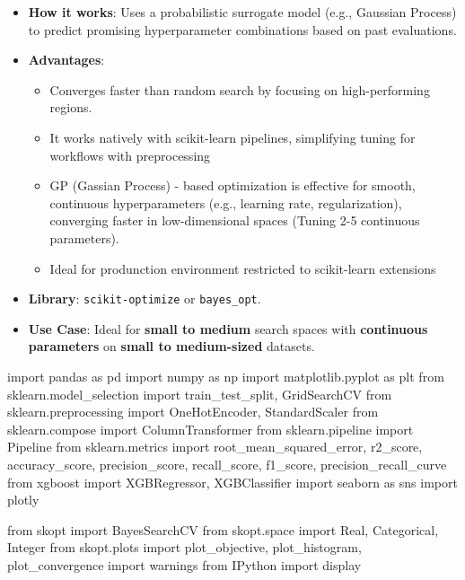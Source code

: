 \documentclass[
  letterpaper,
  DIV=11,
  numbers=noendperiod]{scrreprt}
\newenvironment{Shaded}{\begin{snugshade}}{\end{snugshade}}
\newcommand{\ImportTok}[1]{\textcolor[rgb]{0.00,0.46,0.62}{#1}}
\newcommand{\NormalTok}[1]{\textcolor[rgb]{0.00,0.23,0.31}{#1}}
\providecommand{\tightlist}{%
  \setlength{\itemsep}{0pt}\setlength{\parskip}{0pt}}\usepackage{longtable,booktabs,array}
\begin{document}
\begin{itemize}
\item
  \textbf{How it works}: Uses a probabilistic surrogate model (e.g.,
  Gaussian Process) to predict promising hyperparameter combinations
  based on past evaluations.
\item
  \textbf{Advantages}:

  \begin{itemize}
  \tightlist
  \item
    Converges faster than random search by focusing on high-performing
    regions.
  \item
    It works natively with scikit-learn pipelines, simplifying tuning
    for workflows with preprocessing
  \item
    GP (Gassian Process) - based optimization is effective for smooth,
    continuous hyperparameters (e.g., learning rate, regularization),
    converging faster in low-dimensional spaces (Tuning 2-5 continuous
    parameters).
  \item
    Ideal for produnction environment restricted to scikit-learn
    extensions
  \end{itemize}
\item
  \textbf{Library}: \texttt{scikit-optimize} or \texttt{bayes\_opt}.
\item
  \textbf{Use Case}: Ideal for \textbf{small to medium} search spaces
  with \textbf{continuous parameters} on \textbf{small to medium-sized}
  datasets.
\end{itemize}

\begin{Shaded}
\begin{Highlighting}[]
\ImportTok{import}\NormalTok{ pandas }\ImportTok{as}\NormalTok{ pd}
\ImportTok{import}\NormalTok{ numpy }\ImportTok{as}\NormalTok{ np}
\ImportTok{import}\NormalTok{ matplotlib.pyplot }\ImportTok{as}\NormalTok{ plt}
\ImportTok{from}\NormalTok{ sklearn.model\_selection }\ImportTok{import}\NormalTok{ train\_test\_split, GridSearchCV}
\ImportTok{from}\NormalTok{ sklearn.preprocessing }\ImportTok{import}\NormalTok{ OneHotEncoder, StandardScaler}
\ImportTok{from}\NormalTok{ sklearn.compose }\ImportTok{import}\NormalTok{ ColumnTransformer}
\ImportTok{from}\NormalTok{ sklearn.pipeline }\ImportTok{import}\NormalTok{ Pipeline}
\ImportTok{from}\NormalTok{ sklearn.metrics }\ImportTok{import}\NormalTok{ root\_mean\_squared\_error, r2\_score, accuracy\_score, precision\_score, recall\_score, f1\_score, precision\_recall\_curve}
\ImportTok{from}\NormalTok{ xgboost }\ImportTok{import}\NormalTok{ XGBRegressor, XGBClassifier}
\ImportTok{import}\NormalTok{ seaborn }\ImportTok{as}\NormalTok{ sns}
\ImportTok{import}\NormalTok{ plotly}

\ImportTok{from}\NormalTok{ skopt }\ImportTok{import}\NormalTok{ BayesSearchCV}
\ImportTok{from}\NormalTok{ skopt.space }\ImportTok{import}\NormalTok{ Real, Categorical, Integer}
\ImportTok{from}\NormalTok{ skopt.plots }\ImportTok{import}\NormalTok{ plot\_objective, plot\_histogram, plot\_convergence}
\ImportTok{import}\NormalTok{ warnings}
\ImportTok{from}\NormalTok{ IPython }\ImportTok{import}\NormalTok{ display}
\end{Highlighting}
\end{Shaded}
\end{document}
